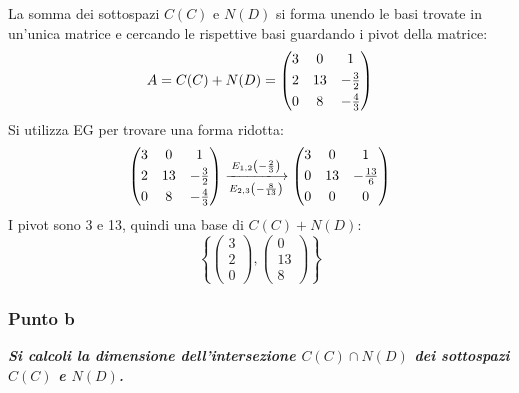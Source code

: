 \documentclass[a4paper]{article}
\makeatletter
\newenvironment{rowequmat}[1]{\left(\array{@{}#1@{}}}{\endarray\right)}
\makeatother
\begin{document}
	\noindent
	La somma dei sottospazi $C(C)$ e $N(D)$ si forma unendo le basi trovate in un'unica matrice e cercando le rispettive basi guardando i pivot della matrice:
	\begin{equation*}
		A = C(C) + N(D) = \begin{rowequmat}{ccc}
			3 & 0  & 1 \\ [.3em]
			2 & 13 & -\frac{3}{2} \\ [.3em]
			0 & 8  & -\frac{4}{3}
		\end{rowequmat}
	\end{equation*}
	Si utilizza EG per trovare una forma ridotta:
	\begin{equation*}
		\begin{rowequmat}{ccc}
			3 & 0  & 1 \\ [.3em]
			2 & 13 & -\frac{3}{2} \\ [.3em]
			0 & 8  & -\frac{4}{3}
		\end{rowequmat}
		\xlongrightarrow[E_{2,3}\left(-\frac{8}{13}\right)]{E_{1,2}\left(-\frac{2}{3}\right)}
		\begin{rowequmat}{ccc}
			3 & 0  & 1 \\ [.3em]
			0 & 13 & -\frac{13}{6} \\ [.3em]
			0 & 0  & 0
		\end{rowequmat}
	\end{equation*}
	I pivot sono 3 e 13, quindi una base di $C(C) + N(D)$:
	\begin{equation*}
		\left\{\begin{pmatrix}
			3 \\ 2 \\ 0
		\end{pmatrix}, \begin{pmatrix}
			0 \\ 13 \\ 8 
		\end{pmatrix}\right\}
	\end{equation*}\newpage
	
	\subsubsection{Punto b}
	
	\textcolor{Green4}{\textbf{\emph{Si calcoli la dimensione dell'intersezione $C(C) \cap N(D)$ dei sottospazi $C(C)$ e $N(D)$.}}}\newline
	
\end{document}
